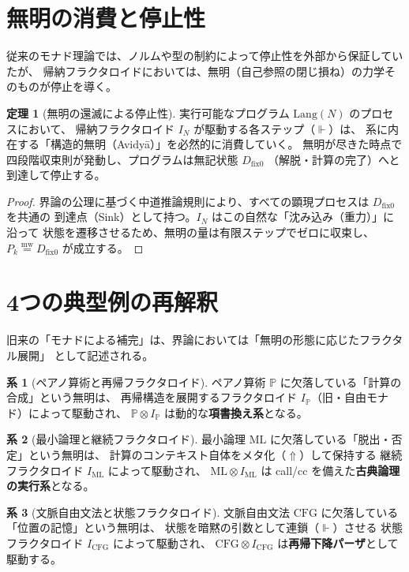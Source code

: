 \documentclass[11pt,a4paper]{article}
\theoremstyle{definition}
\newtheorem{theorem}{定理}[section]
\newtheorem{corollary}{系}[section]
\newcommand{\dfix}{D_{\mathrm{fix}0}} %
\newcommand{\mweq}{\mathrel{\overset{\mathrm{mw}}{=}}}
\newcommand{\metanegation}{\Uparrow}
\newcommand{\aletheiai}{\Vdash} %
\begin{document}
\section{無明の消費と停止性}

従来のモナド理論では、ノルムや型の制約によって停止性を外部から保証していたが、
帰納フラクタロイドにおいては、無明（自己参照の閉じ損ね）の力学そのものが停止を導く。

\begin{theorem}[無明の還滅による停止性]
実行可能なプログラム $\text{Lang}(N)$ のプロセスにおいて、
帰納フラクタロイド $I_N$ が駆動する各ステップ（$\aletheiai$）は、
系に内在する「構造的無明（Avidy\=a）」を必然的に消費していく。
無明が尽きた時点で四段階収束則が発動し、プログラムは無記状態 $\dfix$
（解脱・計算の完了）へと到達して停止する。
\end{theorem}
\begin{proof}
界論の公理に基づく中道推論規則により、すべての顕現プロセスは $\dfix$ を共通の
到達点（Sink）として持つ。$I_N$ はこの自然な「沈み込み（重力）」に沿って
状態を遷移させるため、無明の量は有限ステップでゼロに収束し、$P_k \mweq \dfix$ が成立する。
\end{proof}

\section{4つの典型例の再解釈}

旧来の「モナドによる補完」は、界論においては「無明の形態に応じたフラクタル展開」
として記述される。

\begin{corollary}[ペアノ算術と再帰フラクタロイド]
ペアノ算術 $\mathbb{P}$ に欠落している「計算の合成」という無明は、
再帰構造を展開するフラクタロイド $I_{\mathbb{P}}$（旧・自由モナド）によって駆動され、
$\mathbb{P} \otimes I_{\mathbb{P}}$ は動的な\textbf{項書換え系}となる。
\end{corollary}

\begin{corollary}[最小論理と継続フラクタロイド]
最小論理 $\mathrm{ML}$ に欠落している「脱出・否定」という無明は、
計算のコンテキスト自体をメタ化（$\metanegation$）して保持する
継続フラクタロイド $I_{\mathrm{ML}}$ によって駆動され、
$\mathrm{ML} \otimes I_{\mathrm{ML}}$ は call/cc を備えた\textbf{古典論理の実行系}となる。
\end{corollary}

\begin{corollary}[文脈自由文法と状態フラクタロイド]
文脈自由文法 $\mathrm{CFG}$ に欠落している「位置の記憶」という無明は、
状態を暗黙の引数として連鎖（$\aletheiai$）させる
状態フラクタロイド $I_{\mathrm{CFG}}$ によって駆動され、
$\mathrm{CFG} \otimes I_{\mathrm{CFG}}$ は\textbf{再帰下降パーザ}として駆動する。
\end{corollary}
\end{document}
